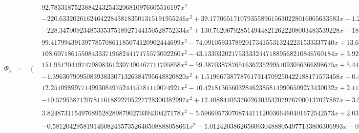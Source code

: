 \documentclass{article}
\begin{document}
\begin{landscape}
\begin{eqnarray*}
\begin{array}{cc}
\end{array}\\
\Psi_3 & = & \begin{array}{cc}
 \{ & 
\begin{array}{cc}
 92.78331875238842432543206810976605516197 x^2 & x\geq 0\land x<\frac{1}{16} \\
 -220.6332026162464228438183501315191955246 x^2+39.17706517107935589615630228016065633583 x-1.224283286596229871754884446255020510495 & x\geq \frac{1}{16}\land x<\frac{1}{8} \\
 -228.3470092348533537518927144150528752334 x^2+130.7620679285149448212622208003483539228 x-18.32472741726204352715346836043452799825 & x\geq \frac{1}{4}\land x<\frac{5}{16} \\
 99.41799439139778570861185074120902444699 x^2-74.09105933789201734155313242231533337740 x+13.68357371811404431078643058060667314241 & x\geq \frac{5}{16}\land x<\frac{3}{8} \\
 108.6071861550843337196824417175573002260 x^2-43.13303202175333324471889568210846760184 x+3.920097787955813199549815426386799735610 & x\geq \frac{1}{8}\land x<\frac{3}{16} \\
 151.9512041974798083612307490467711705858 x^2-59.38703878765163623529951093056366898675 x+5.443910922258779104916748105929474865445 & x\geq \frac{3}{16}\land x<\frac{1}{4} \\
 -1.396307909508393833071326384795648820820 x^2+1.519667387787617314709250422188171573458 x-0.4934375429508871872627662027377340358777 & x\geq \frac{3}{8}\land x<\frac{7}{16} \\
 12.25109899771499308497524445781110074921 x^2-10.42181365603284623858149906509273430032 x+2.118761435384839215019585247604964124012 & x\geq \frac{7}{16}\land x<\frac{1}{2} \\
 -10.57955871207811618892705227728300382997 x^2+12.40884405376026303532079767000137027887 x-3.588902992063438103455988936168562020785 & \left(x\geq \frac{1}{2}\land x<\frac{9}{16}\right)\lor \left(x\geq \frac{9}{16}\land x<\frac{5}{8}\right) \\
 3.824873115497089528289879027039430427178 x^2-5.596695730708744111200366460401672542573 x+2.037828190583126629831874854582388860914 & \left(x\geq \frac{5}{8}\land x<\frac{11}{16}\right)\lor \left(x\geq \frac{11}{16}\land x<\frac{3}{4}\right) \\
 -0.5812042958191460824357352646508888058661 x^2+1.012420386265609304888054977133806306993 x-0.4405903532822559012012831844934157076727 & \left(x\geq \frac{3}{4}\land x<\frac{13}{16}\right)\lor \left(x\geq \frac{13}{16}\land x<\frac{7}{8}\right) \\

\end{array}
\end{array}
\end{eqnarray*}
\end{landscape}
\end{document}
